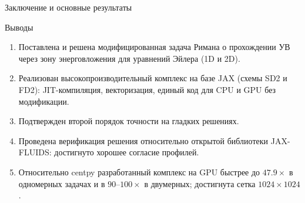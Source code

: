 \documentclass[ignoreonframetext,unicode,aspectratio=169]{beamer}
\begin{document}
%				
%		
	

	\begin{frame}{Заключение и основные результаты}

		\begin{block}{Выводы}
			\begin{enumerate}
				\item Поставлена и решена модифицированная задача Римана о прохождении УВ через зону энерговложения для уравнений Эйлера (1D и 2D).
				\item Реализован высокопроизводительный комплекс на базе JAX (схемы SD2 и FD2): JIT-компиляция, векторизация, единый код для CPU и GPU без модификации.
				\item Подтвержден второй порядок точности на гладких решениях.
				\item Проведена верификация решения относительно открытой библиотеки JAX-FLUIDS: достигнуто хорошее согласие профилей.
				\item Относительно centpy разработанный комплекс на GPU быстрее до $47.9\times$ в одномерных задачах и в $90$–$100\times$ в двумерных; достигнута сетка $1024\times1024$.
			\end{enumerate}
		\end{block}

	\end{frame}
\end{document}
